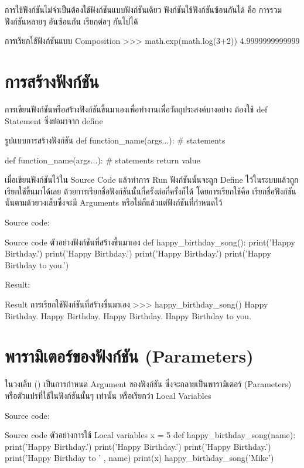 การใช้ฟังก์ชันไม่จำเป็นต้องใช้ฟังก์ชันแบบฟังก์ชันเดียว ฟังก์ชันใช้ฟังก์ชันซ้อนกันได้ คือ การรวมฟังก์ชันหลายๆ อันซ้อนกัน เรียกต่อๆ กันไปได้

\begin{codelist}{การเรียกใช้ฟังก์ชันแบบ Composition}{}
>>> math.exp(math.log(3+2))
4.9999999999999
\end{codelist}

\section{การสร้างฟังก์ชัน}

การเขียนฟังก์ชันหรือสร้างฟังก์ชันขึ้นมาเองเพื่อทำงานเพื่อวัตถุประสงค์บางอย่าง ต้องใช้ def Statement ซึ่งย่อมาจาก define 

\begin{codelist}{รูปแบบการสร้างฟังก์ชัน}{}
def function_name(args...):
    # statements

def function_name(args...):
    # statements
    return value
\end{codelist}

เมื่อเขียนฟังก์ชันไว้ใน Source Code แล้วทำการ Run ฟังก์ชันนั้นจะถูก Define ไว้ในระบบแล้วถูกเรียกใช้ขึ้นมาได้เลย ด้วยการเรียกชื่อฟังก์ชันนั้นกี่ครั้งต่อกี่ครั้งก็ได้ โดยการเรียกใช้คือ เรียกชื่อฟังก์ชันนั้นตามด้วยวงเล็บซึ่งจะมี Arguments หรือไม่ก็แล้วแต่ฟังก์ชันที่กำหนดไว้

Source code:
\begin{codelist}{Source code ตัวอย่างฟังก์ชันที่สร้างขึ้นมาเอง}{}
def happy_birthday_song():
    print('Happy Birthday.')
    print('Happy Birthday.')
    print('Happy Birthday.')
    print('Happy Birthday to you.')
\end{codelist}

Result:
\begin{codelist}{Result การเรียกใช้ฟังก์ชันที่สร้างขึ้นมาเอง}{}
>>>  happy_birthday_song()
Happy Birthday.
Happy Birthday.
Happy Birthday.
Happy Birthday to you.
\end{codelist}


\section{พารามิเตอร์ของฟังก์ชัน (Parameters)}

ในวงเล็บ () เป็นการกำหนด Argument ของฟังก์ชัน ซึ่งจะกลายเป็นพารามิเตอร์ (Parameters) หรือตัวแปรที่ใช้ในฟังก์ชันนั้นๆ เท่านั้น หรือเรียกว่า Local Variables 

Source code:
\begin{codelist}{Source code ตัวอย่างการใช้ Local variables}{}
x = 5
def happy_birthday_song(name):
    print('Happy Birthday.')
    print('Happy Birthday.')
    print('Happy Birthday.')
    print('Happy Birthday to ' , name)
    print(x)
happy_birthday_song('Mike')
\end{codelist}

